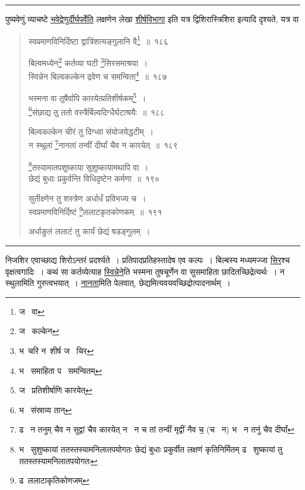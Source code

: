 \documentclass[11pt, openany]{book}
\begin{document}
\hrule

\vspace{2mm}
पुष्यवेणुं व्याचष्टे \underline{भवेद्वेणुर्दीर्घपर्वेति} लक्षणेन लेखा \underline{शीर्षविभागा} इति यत्र द्विशिरास्त्रिशिरा इत्यादि दृश्यते, यत्र वा

\newpage

\begin{quote}
{\na स्वप्रमाणविनिर्दिष्टा द्वात्रिंशत्यङ्गुलानि वै\renewcommand{\thefootnote}{1}\footnote{ज \textendash\ वा}~॥~१८६

बिल्वमध्येन\renewcommand{\thefootnote}{2}\footnote{ज \textendash\ कल्केन} कर्तव्या घटी \renewcommand{\thefootnote}{3}\footnote{भ\textendash\ चरि न\textendash\ शीर्ष ज \textendash\ चिर}सिरसमाश्रया~।\\
स्विन्नेन बिल्वकल्केन द्रवेण च समन्विता\renewcommand{\thefootnote}{4}\footnote{भ \textendash\ समाहिता प \textendash\ समन्वितम्}~॥~१८७

भस्मना वा तुषैर्वापि कारयेत्प्रतिशीर्षकम्\renewcommand{\thefootnote}{5}\footnote{ज \textendash\ प्रतिशीर्षाणि कारयेत्}~।\\
\renewcommand{\thefootnote}{6}\footnote{भ \textendash\ संस्राव्य तान्}संछाद्य तु ततो वस्त्रैर्बिल्वदिग्धैर्घटाश्रयैः~॥~१८८

बिल्वकल्केन चीरं तु दिग्ध्वा संयोजयेद्धटीम्~।\\
न स्थूलां \renewcommand{\thefootnote}{7}\footnote{ढ \textendash\ न तनुम् चैव न सुद्वां चैव कारयेत् न \textendash\ न च तां तन्वीं मृद्वीं नैव च॒ (च \textendash\ न) भ \textendash\ न तनुं चैव दीर्घां}नानतां तन्वीं दीर्घां चैव न कारयेत्~॥~१८९

\renewcommand{\thefootnote}{8}\footnote{भ \textendash\ सुशुष्कायां ततस्तस्यामनिलातपयोगतः छेद्यं बुधाः प्रकुर्वीत लक्षणं कृतिनिर्मितम् ढ \textendash\ शुष्कायां तु ततस्तस्यामनिलातपयोगतः}तस्यामातपशुष्काया सुशुष्कायामथापि वा~।\\
छेद्यं बुधाः प्रकुर्वन्ति विधिदृष्टेन कर्मणा~॥~१९०

सुतीक्ष्णेन तु शस्त्रेण अर्धार्धं प्रविभज्य च~।\\
स्वप्रमाणविनिर्दिष्टं \renewcommand{\thefootnote}{9}\footnote{ढ\textendash\ ललाटाकृतिकोणजम्}ललाटकृतकोणकम्~॥~१९१

अर्धाङुलं ललाटं तु कार्यं छेद्यं षडङ्गुलम्~।}
\end{quote}

\hrule

\vspace{2mm}
\noindent
निजशिर एवाच्छाद्य शिरोऽन्तरं प्रदर्श्यते~। प्रतिपादप्रतिहस्तादेष एव कल्पः~। बिल्बस्य मध्यमज्जा \underline{सिर}श्च वृक्षत्वगादिः~। कथं सा कर्तव्येत्याह \underline{स्विन्नेने}ति भस्मना तुषचूर्णेन वा सुसमाहिता छादितच्छिद्रेत्यर्थः~। न स्थुलामिति गुरुत्वभयात्~। \underline{नानता}मिति पेलवात्, छेद्यमित्यवयवच्छिद्रोत्पादनार्थम्~।
\end{document}
